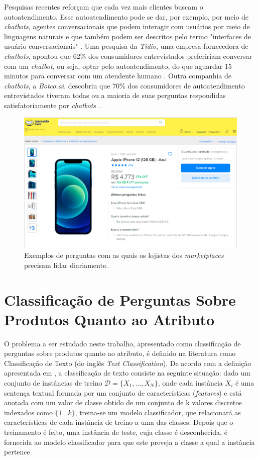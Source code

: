 Pesquisas recentes reforçam que cada vez mais clientes buscam o autoatendimento. Esse autoatendimento pode se dar, por exemplo, por meio de \textit{chatbots}, agentes conversacionais que podem interagir com usuários por meio de linguagens naturais e que também podem ser descritos pelo termo "interfaces de usuário conversacionais" 
 \cite{chatbots_survey1}. Uma pesquisa da \textit{Tidio}, uma empresa fornecedora de \textit{chatbots}, apontou que 62\% dos consumidores entrevistados prefeririam conversar com um \textit{chatbot}, ou seja, optar pelo autoatendimento, do que aguardar 15 minutos para conversar com um atendente humano \cite{chatbots_survey2}. Outra companhia de \textit{chatbots}, a \textit{Botco.ai}, descobriu que 70\% dos consumidores de autoatendimento entrevistados tiveram todas ou a maioria de suas perguntas respondidas satisfatoriamente por \textit{chatbots} \cite{chatbots_survey3}.

\begin{figure}[htb]
        \centering
        \includegraphics[width=14cm]{figuras/montagem_perguntas.png}
        \caption{Exemplos de perguntas com as quais os lojistas dos \textit{marketplaces} precisam lidar diariamente.}
        \label{fig:montagem_perguntas}
\end{figure}

\section{Classificação de Perguntas Sobre Produtos Quanto ao Atributo}
\label{classificação}
O problema a ser estudado neste trabalho, apresentado como classificação de perguntas sobre produtos quanto ao atributo, é definido na literatura como Classificação de Texto (do inglês \textit{Text Classification}). De acordo com a definição apresentada em \cite{survey}, a classificação de texto consiste na seguinte situação: dado um conjunto de instâncias de treino $\mathcal{D} = \{X_1, ..., X_N\}$, onde cada instância $X_i$ é uma sentença textual formada por um conjunto de características (\textit{features}) e está anotada com um valor de classe obtido de um conjunto de k valores discretos indexados como $\{1...k\}$,  treina-se um modelo classificador, que relacionará as características de cada instância de treino a uma das classes. Depois que o treinamento é feito, uma instância de teste, cuja classe é desconhecida, é fornecida ao modelo classificador para que este preveja a classe a qual a instância pertence.

